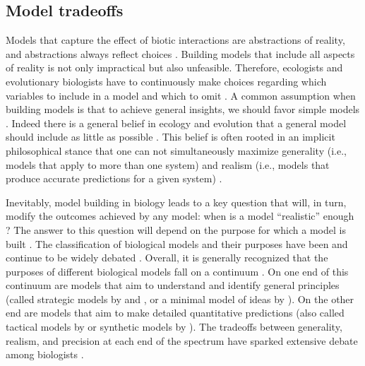 \begin{refsection}
\subsection*{Model tradeoffs}
Models that capture the effect of biotic interactions are abstractions of reality, and abstractions always reflect choices \citep{levins2006strategies}. Building models that include all aspects of reality is not only impractical but also unfeasible.  Therefore, ecologists and evolutionary biologists have to continuously make choices regarding which variables to include in a model and which to omit \citep{odenbaugh2005idealized}. A common assumption when building models is that to achieve general insights, we should favor simple models \citep{evans2013simple}. Indeed there is a general belief in ecology and evolution that a general model should include as little as possible \citep{holling1966strategy,may2019stability,roughgarden2018adaptive}. This belief is often rooted in an implicit philosophical stance that one can not simultaneously maximize generality (i.e., models that apply to more than one system) and realism (i.e., models that produce accurate predictions for a given system) \citep{levins1966strategy,levins1993response}.


Inevitably, model building in biology leads to a key question that will, in turn, modify the outcomes achieved by any model: when is a model ``realistic'' enough \citep{stouffer2019all}? The answer to this question will depend on the purpose for which a model is built \citep{odenbaugh2005idealized,levins2006strategies}. The classification of biological models and their purposes have been and continue to be widely debated \citep{holling1966strategy,may2019stability,lewontin1963models,levins1966strategy,orzack1993critical,levins1993response,odenbaugh2005idealized,weisberg2006forty,evans2013simple}. Overall, it is generally recognized that the purposes of different biological models fall on a continuum \citep{levins1993response,evans2013simple,servedio2014not}. On one end of this continuum are models that aim to understand and identify general principles (called strategic models by \citet{holling1966strategy} and \citet{may2019stability}, or a minimal model of ideas by \citet{roughgarden2018adaptive}). On the other end are models that aim to make detailed quantitative predictions (also called tactical models by \citet{holling1966strategy} or synthetic models by \citet{roughgarden2018adaptive}). The tradeoffs between generality, realism, and precision at each end of the spectrum have sparked extensive debate among biologists \citep{levins1966strategy,orzack1993critical,levins1993response,weisberg2006forty}.


\end{refsection}

